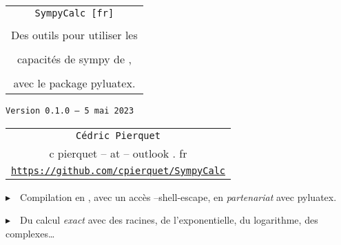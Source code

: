 \documentclass[french,a4paper,11pt]{article}
\def\SCversion{0.1.0}
\def\SCdate{5 mai 2023}
\begin{document}
\setlength{\aweboxleftmargin}{0.07\linewidth}
\setlength{\aweboxcontentwidth}{0.93\linewidth}
\setlength{\aweboxvskip}{8pt}

\pagestyle{fancy}

\thispagestyle{empty}

\vspace{2cm}

\begin{center}
	\begin{minipage}{0.75\linewidth}
	\begin{tcolorbox}[colframe=yellow,colback=yellow!15]
		\begin{center}
			\begin{tabular}{c}
				{\Huge \texttt{SympyCalc [fr]}}\\
				\\
				{\LARGE Des outils pour utiliser les} \\
				\\
				{\LARGE capacités de \textsf{sympy} de \faPython, } \\
				\\
				{\LARGE avec le package \textsf{pyluatex}.} \\
			\end{tabular}
			
			\bigskip
			
			{\small \texttt{Version \SCversion{} -- \SCdate}}
		\end{center}
	\end{tcolorbox}
\end{minipage}
\end{center}

\begin{center}
	\begin{tabular}{c}
	\texttt{Cédric Pierquet}\\
	{\ttfamily c pierquet -- at -- outlook . fr}\\
	\texttt{\url{https://github.com/cpierquet/SympyCalc}}
\end{tabular}
\end{center}

\vspace{0.25cm}

{$\blacktriangleright$~~Compilation en , avec un accès \textsf{--shell-escape}, en \textit{partenariat} avec \textsf{pyluatex}.}

\smallskip

{$\blacktriangleright$~~Du calcul \textit{exact} avec des racines, de l'exponentielle, du logarithme, des complexes\ldots}
\end{document}
